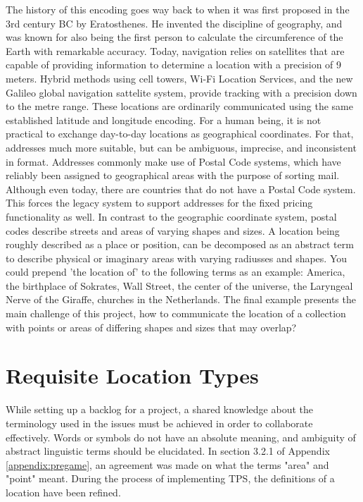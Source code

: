 The history of this encoding goes way back to when it was first proposed in the 3rd century BC by Eratosthenes. He invented the discipline of geography, and was known for also being the first person to calculate the circumference of the Earth with remarkable accuracy. Today, navigation relies on satellites that are capable of providing information to determine a location with a precision of 9 meters. Hybrid methods using cell towers, Wi-Fi Location Services, and the new Galileo global navigation sattelite system, provide tracking with a precision down to the metre range. These locations are ordinarily communicated using the same established latitude and longitude encoding. For a human being, it is not practical to exchange day-to-day locations as geographical coordinates. For that, addresses much more suitable, but can be ambiguous, imprecise, and inconsistent in format. Addresses commonly make use of Postal Code systems, which have reliably been assigned to geographical areas with the purpose of sorting mail. Although even today, there are countries that do not have a Postal Code system. This forces the legacy system to support addresses for the fixed pricing functionality as well. In contrast to the geographic coordinate system, postal codes describe streets and areas of varying shapes and sizes. A location being roughly described as a place or position, can be decomposed as an abstract term to describe physical or imaginary areas with varying radiusses and shapes. You could prepend 'the location of' to the following terms as an example: America, the birthplace of Sokrates, Wall Street, the center of the universe, the Laryngeal Nerve of the Giraffe, churches in the Netherlands. The final example presents the main challenge of this project, how to communicate the location of a collection with points or areas of differing shapes and sizes that may overlap?

%
\section{Requisite Location Types}
While setting up a backlog for a project, a shared knowledge about the terminology used in the issues must be achieved in order to collaborate effectively. Words or symbols do not have an absolute meaning, and ambiguity of abstract linguistic terms should be elucidated. In section 3.2.1 of Appendix \ref{appendix:pregame}, an agreement was made on what the terms "area" and "point" meant. During the process of implementing TPS, the definitions of a location have been refined.

